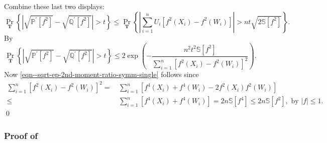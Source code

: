 Combine these last two displays:
\begin{equation*}
  \Pr_{\mathbf{T}} \left\{ \left| \sqrt{\mathbb{P}^{\prime} \left[ f^{2}
  \right]} - \sqrt{\mathbb{Q}^{\prime} \left[ f^{2} \right]} \right| > t
  \right\} \leq \Pr_{\mathbf{T}} \left\{ \left| \sum_{i = 1}^{n} U_{i} \left[
  f^{2} \left( X_{i} \right) - f^{2} \left( W_{i} \right) \right] \right| > n t
  \sqrt{2 \mathbb{S} \left[ f^{2} \right]} \right\}.
\end{equation*}
By 
\begin{equation*}
  \Pr_{\mathbf{T}} \left\{ \left| \sqrt{\mathbb{P}^{\prime} \left[ f^{2}
  \right]} - \sqrt{\mathbb{Q}^{\prime} \left[ f^{2} \right]} \right| > t
  \right\} \leq 2 \exp \left( - \frac{n^{2} t^{2} \mathbb{S} \left[ f^{2}
  \right]}{\sum_{i = 1}^{n} \left[ f^{2} \left( X_{i} \right) - f^{2} \left(
  W_{i} \right) \right]^{2}} \right).
\end{equation*}
Now \eqref{eqn--sqrt-ep-2nd-moment-ratio-symm-single} follows
since
\begin{equation*}
  \begin{split}
  \sum_{i = 1}^{n} \left[ f^{2} \left( X_{i} \right) - f^{2} \left(W_{i} \right)
  \right]^{2} =
  & \, \sum_{i = 1}^{n} \left[ f^{4} \left( X_{i} \right) + f^{4}
  \left( W_{i} \right) - 2 f^{2} \left( X_{i} \right) f^{2} \left( W_{i} \right)
  \right] \\
  \leq
  & \, \sum_{i = 1}^{n} \left[ f^{4} \left( X_{i} \right) + f^{4} \left( W_{i}
  \right) \right] = 2 n \mathbb{S} \left[ f^{4} \right] \leq 2 n \mathbb{S}
  \left[ f^{2} \right], \text{ by } |f| \leq 1.
  \end{split}
\end{equation*}
\qed

\subsubsection{Proof of
\texorpdfstring{}{Lemma
\ref{lem--sqrt-ep-2nd-moment-sup-symm-pbound}}}
\label{sec--prf--lem--sqrt-ep-2nd-moment-sup-symm-pbound}

